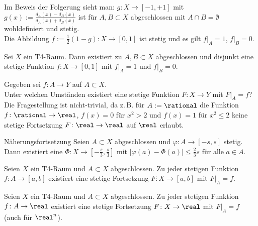 \begin{Bem}
    Im Beweis der Folgerung sieht man:
    $g\colon X \rightarrow [-1, +1]$ mit
    $g(x) := \frac{d_A(x) - d_B(x)}{d_A(x) + d_B(x)}$ ist für $A, B \subset X$
    abgeschlossen mit $A \cap B = \emptyset$ wohldefiniert und stetig. \\
    Die Abbildung $f := \frac{1}{2}(1 - g)\colon X \rightarrow [0, 1]$ ist
    stetig und es gilt $f|_A = 1$, $f|_B = 0$.
\end{Bem}

\begin{Satz}{}
    Sei $X$ ein T4-Raum.
    Dann existiert zu $A, B \subset X$ abgeschlossen und disjunkt eine
    stetige Funktion $f\colon X \rightarrow [0, 1]$ mit $f|_A = 1$ und
    $f|_B = 0$.
\end{Satz}

\linie

\begin{Bem}
    Gegeben sei $f\colon A \rightarrow Y$ auf $A \subset X$. \\
    Unter welchen Umständen existiert eine stetige Funktion
    $F\colon X \rightarrow Y$ mit $F|_A = f$? \\
    Die Fragestellung ist nicht-trivial, da z.\,B.
    für $A := \rational$ die Funktion $f\colon \rational \rightarrow \real$,
    $f(x) = 0$ für $x^2 > 2$ und $f(x) = 1$ für $x^2 \le 2$ keine stetige
    Fortsetzung $F\colon \real \rightarrow \real$ auf $\real$ erlaubt.
\end{Bem}

\begin{Lemma}{Näherungsfortsetzung}
    Seien $A \subset X$ abgeschlossen und $\varphi\colon A \rightarrow [-s, s]$
    stetig.
    Dann existiert eine 
    $\Phi\colon X \rightarrow \left[-\frac{s}{3}, \frac{s}{3}\right]$ mit
    $|\varphi(a) - \Phi(a)| \le \frac{2}{3}s$ für alle $a \in A$.
\end{Lemma}

\begin{Satz}{}
    Seien $X$ ein T4-Raum und $A \subset X$ abgeschlossen.
    Zu jeder stetigen Funktion $f\colon A \rightarrow [a, b]$ existiert
    eine stetige Fortsetzung $F\colon X \rightarrow [a, b]$ mit $F|_A = f$.
\end{Satz}

\begin{Kor}
    Seien $X$ ein T4-Raum und $A \subset X$ abgeschlossen.
    Zu jeder stetigen Funktion $f\colon A \rightarrow \real$ existiert
    eine stetige Fortsetzung $F\colon X \rightarrow \real$ mit $F|_A = f$
    (auch für $\real^n$).
\end{Kor}

